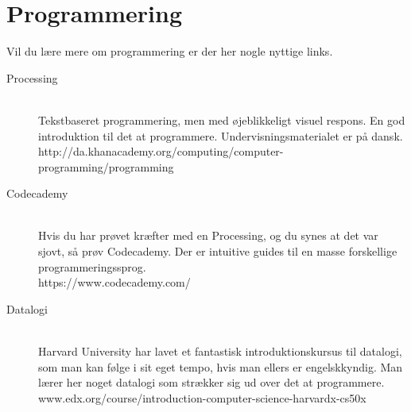 \documentclass[11pt]{article}
\begin{document}
\section{Programmering}
    Vil du lære mere om programmering er der her nogle nyttige links.
    \begin{description}
        \item[Processing]~\\
            Tekstbaseret programmering, men med øjeblikkeligt visuel respons.
            En god introduktion til det at programmere.
            Undervisningsmaterialet er på dansk.\\
            http://da.khanacademy.org/computing/computer-programming/programming
        \item[Codecademy]~\\
            Hvis du har prøvet kræfter med en Processing, og du synes at det 
            var sjovt, så prøv Codecademy. Der er intuitive guides til en masse 
            forskellige programmeringssprog. \\ 
            https://www.codecademy.com/
        \item[Datalogi]~\\
            Harvard University har lavet et fantastisk introduktionskursus til 
            datalogi, som man kan følge i sit eget tempo, hvis man ellers er 
            engelskkyndig. Man lærer her noget datalogi som strækker sig ud over
            det at programmere. \\
            www.edx.org/course/introduction-computer-science-harvardx-cs50x
    \end{description}
\end{document}
